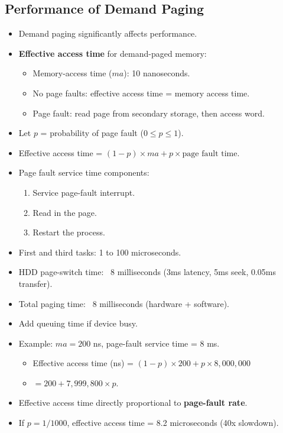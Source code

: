 \subsection{Performance of Demand Paging}
\begin{itemize}
    \item Demand paging significantly affects performance.
    \item \textbf{Effective access time} for demand-paged memory:
    \begin{itemize}
        \item Memory-access time ($ma$): 10 nanoseconds.
        \item No page faults: effective access time = memory access time.
        \item Page fault: read page from secondary storage, then access word.
    \end{itemize}
    \item Let $p$ = probability of page fault ($0 \le p \le 1$).
    \item Effective access time = $(1 - p) \times ma + p \times \text{page fault time}$.
    \item Page fault service time components:
    \begin{enumerate}
        \item Service page-fault interrupt.
        \item Read in the page.
        \item Restart the process.
    \end{enumerate}
    \item First and third tasks: 1 to 100 microseconds.
    \item HDD page-switch time: ~8 milliseconds (3ms latency, 5ms seek, 0.05ms transfer).
    \item Total paging time: ~8 milliseconds (hardware + software).
    \item Add queuing time if device busy.
    \item Example: $ma = 200$ ns, page-fault service time = 8 ms.
    \begin{itemize}
        \item Effective access time (ns) = $(1 - p) \times 200 + p \times 8,000,000$
        \item $= 200 + 7,999,800 \times p$.
    \end{itemize}
    \item Effective access time directly proportional to \textbf{page-fault rate}.
    \item If $p = 1/1000$, effective access time = 8.2 microseconds (40x slowdown).

\end{itemize}
